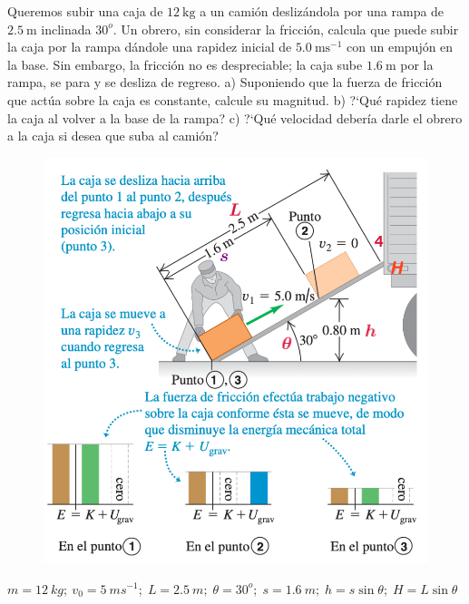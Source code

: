 \vspace{30mm} %
\begin{prob}

Queremos subir una caja de $12 \ \mathrm{kg}$ a un camión deslizándola por una rampa de $2.5 \ \mathrm{m}$ inclinada $30^o$. Un obrero, sin considerar la fricción, calcula que puede subir la caja por la rampa dándole una rapidez inicial de $5.0 \ \mathrm{ms}^{-1}$ con un empujón en la base. Sin embargo, la fricción no es despreciable; la caja sube $1.6 \ \mathrm{m}$ por la rampa, se para y se desliza de regreso. a) Suponiendo que la fuerza de fricción que actúa sobre la caja es constante, calcule su magnitud. b) ?`Qué rapidez tiene la caja al volver a la base de la rampa? c) ?`Qué velocidad debería darle el obrero a la caja si desea que suba al camión?
	
\end{prob}

\vspace{30mm} %

\newpage %

\begin{figure}[H]
	\centering
	\includegraphics[width=.85\textwidth]{imagenes/imagenes04/T04IM17.png}
\end{figure}
	
$m=12\ {kg}; \ v_0=5 \ {ms}^{-1}; \; L=2.5\ {m};\; \theta=30^o;\; s=1.6\ {m};\; h=s \sin \theta;\; H=L\sin \theta$

